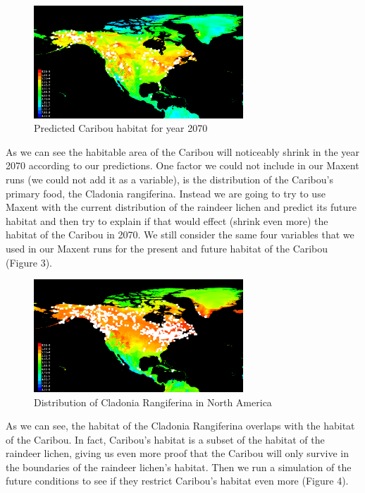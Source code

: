 \documentclass[twoside]{article}
\begin{document}
\begin{figure}[h!]
\centering
\includegraphics[width=0.7\textwidth]{NCaribouFuture}
\caption{Predicted Caribou habitat for year 2070}
\end{figure}

As we can see the habitable area of the Caribou will noticeably shrink
in the year 2070 according to our predictions. One factor we could not
include in our Maxent runs (we could not add it as a variable), is the
distribution of the Caribou's primary food, the Cladonia rangiferina.
Instead we are going to try to use Maxent with the current distribution
of the raindeer lichen and predict its future habitat and then try to
explain if that would effect (shrink even more) the habitat of the
Caribou in 2070. We still consider the same four variables that we used
in our Maxent runs for the present and future habitat of the Caribou (Figure 3).

\begin{figure}[h!]
\centering
\includegraphics[width=0.7\textwidth]{NCladoniaPresent}
\caption{Distribution of Cladonia Rangiferina in North America}
\end{figure}

As we can see, the habitat of the Cladonia Rangiferina overlaps with the
habitat of the Caribou. In fact, Caribou's habitat is a subset of the
habitat of the raindeer lichen, giving us even more proof that the
Caribou will only survive in the boundaries of the raindeer lichen's
habitat. Then we run a simulation of the future conditions to see if they
restrict Caribou's habitat even more (Figure 4).
\end{document}
